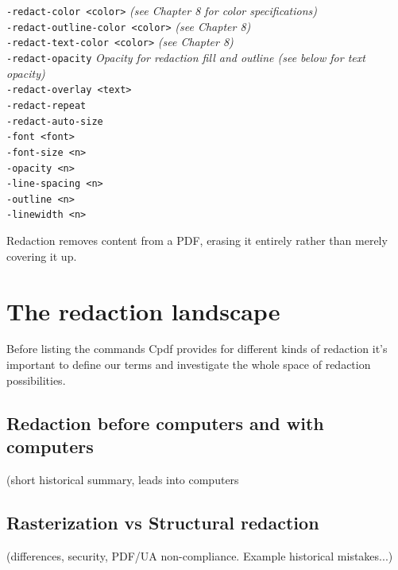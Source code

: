 \documentclass{book}
\begin{document}
{\begin{framed}
  \vspace{1.5mm}
  \noindent\verb!-redact-color <color>! \textit{(see Chapter 8 for color specifications)}\\
  \noindent\verb!-redact-outline-color <color>! \textit{(see Chapter 8)}\\
  \noindent\verb!-redact-text-color <color>! \textit{(see Chapter 8)}\\
  \noindent\verb!-redact-opacity! \textit{Opacity for redaction fill and outline (see below for text opacity)}\\
  \noindent\verb!-redact-overlay <text>!\\
  \noindent\verb!-redact-repeat!\\
  \noindent\verb!-redact-auto-size!\\
  \noindent\verb!-font <font>!\\
  \noindent\verb!-font-size <n>!\\
  \noindent\verb!-opacity <n>!\\
  \noindent\verb!-line-spacing <n>!\\
  \noindent\verb!-outline <n>!\\
  \noindent\verb!-linewidth <n>!
  \end{framed}}

Redaction removes content from a PDF, erasing it entirely rather than merely covering it up.

\section{The redaction landscape}

Before listing the commands Cpdf provides for different kinds of redaction it's important to define our terms and investigate the whole space of redaction possibilities.

\subsection{Redaction before computers and with computers}

(short historical summary, leads into computers

\subsection{Rasterization vs Structural redaction}

(differences, security, PDF/UA non-compliance. Example historical mistakes...)
\end{document}
